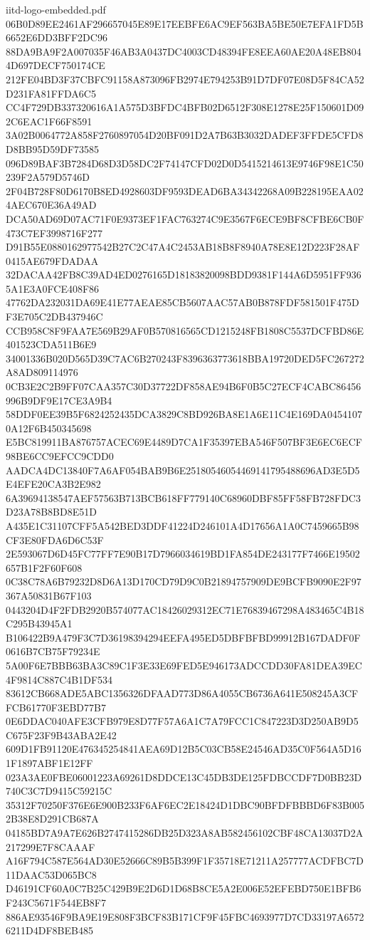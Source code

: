 \begin{filecontents*}[overwrite]{iitd-logo-embedded.pdf}
06B0D89EE2461AF296657045E89E17EEBFE6AC9EF563BA5BE50E7EFA1FD5B6652E6DD3BFF2DC96
88DA9BA9F2A007035F46AB3A0437DC4003CD48394FE8EEA60AE20A48EB8044D697DECF750174CE
212FE04BD3F37CBFC91158A873096FB2974E794253B91D7DF07E08D5F84CA52D231FA81FFDA6C5
CC4F729DB337320616A1A575D3BFDC4BFB02D6512F308E1278E25F150601D092C6EAC1F66F8591
3A02B0064772A858F2760897054D20BF091D2A7B63B3032DADEF3FFDE5CFD8D8BB95D59DF73585
096D89BAF3B7284D68D3D58DC2F74147CFD02D0D5415214613E9746F98E1C50239F2A579D5746D
2F04B728F80D6170B8ED4928603DF9593DEAD6BA34342268A09B228195EAA024AEC670E36A49AD
DCA50AD69D07AC71F0E9373EF1FAC763274C9E3567F6ECE9BF8CFBE6CB0F473C7EF3998716F277
D91B55E0880162977542B27C2C47A4C2453AB18B8F8940A78E8E12D223F28AF0415AE679FDADAA
32DACAA42FB8C39AD4ED0276165D18183820098BDD9381F144A6D5951FF9365A1E3A0FCE408F86
47762DA232031DA69E41E77AEAE85CB5607AAC57AB0B878FDF581501F475DF3E705C2DB437946C
CCB958C8F9FAA7E569B29AF0B570816565CD1215248FB1808C5537DCFBD86E401523CDA511B6E9
34001336B020D565D39C7AC6B270243F8396363773618BBA19720DED5FC267272A8AD809114976
0CB3E2C2B9FF07CAA357C30D37722DF858AE94B6F0B5C27ECF4CABC86456996B9DF9E17CE3A9B4
58DDF0EE39B5F6824252435DCA3829C8BD926BA8E1A6E11C4E169DA04541070A12F6B450345698
E5BC819911BA876757ACEC69E4489D7CA1F35397EBA546F507BF3E6EC6ECF98BE6CC9EFCC9CDD0
AADCA4DC13840F7A6AF054BAB9B6E25180546054469141795488696AD3E5D5E4EFE20CA3B2E982
6A39694138547AEF57563B713BCB618FF779140C68960DBF85FF58FB728FDC3D23A78B8BD8E51D
A435E1C31107CFF5A542BED3DDF41224D246101A4D17656A1A0C7459665B98CF3E80FDA6D6C53F
2E593067D6D45FC77FF7E90B17D7966034619BD1FA854DE243177F7466E19502657B1F2F60F608
0C38C78A6B79232D8D6A13D170CD79D9C0B21894757909DE9BCFB9090E2F97367A50831B67F103
0443204D4F2FDB2920B574077AC18426029312EC71E76839467298A483465C4B18C295B43945A1
B106422B9A479F3C7D36198394294EEFA495ED5DBFBFBD99912B167DADF0F0616B7CB75F79234E
5A00F6E7BBB63BA3C89C1F3E33E69FED5E946173ADCCDD30FA81DEA39EC4F9814C887C4B1DF534
83612CB668ADE5ABC1356326DFAAD773D86A4055CB6736A641E508245A3CFFCB61770F3EBD77B7
0E6DDAC040AFE3CFB979E8D77F57A6A1C7A79FCC1C847223D3D250AB9D5C675F23F9B43ABA2E42
609D1FB91120E476345254841AEA69D12B5C03CB58E24546AD35C0F564A5D161F1897ABF1E12FF
023A3AE0FBE06001223A69261D8DDCE13C45DB3DE125FDBCCDF7D0BB23D740C3C7D9415C59215C
35312F70250F376E6E900B233F6AF6EC2E18424D1DBC90BFDFBBBD6F83B0052B38E8D291CB687A
04185BD7A9A7E626B2747415286DB25D323A8AB582456102CBF48CA13037D2A217299E7F8CAAAF
A16F794C587E564AD30E52666C89B5B399F1F35718E71211A257777ACDFBC7D11DAAC53D065BC8
D46191CF60A0C7B25C429B9E2D6D1D68B8CE5A2E006E52EFEBD750E1BFB6F243C5671F544EB8F7
886AE93546F9BA9E19E808F3BCF83B171CF9F45FBC4693977D7CD33197A65726211D4DF8BEB485

\end{filecontents*}
